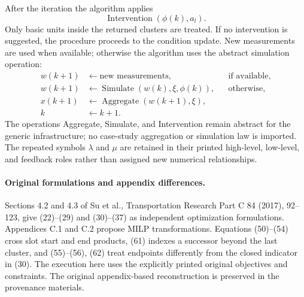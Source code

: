 \documentclass{article}
\begin{document}
After the iteration the algorithm applies
\[
\operatorname{Intervention}(\phi(k),a_l).
\]
Only basic units inside the returned clusters are treated. If no intervention is suggested, the procedure proceeds to the condition update. New measurements are used when available; otherwise the algorithm uses the abstract simulation operation:
\[
\begin{aligned}
w(k+1)&\leftarrow\text{new measurements},&&\text{if available},\\
w(k+1)&\leftarrow\operatorname{Simulate}(w(k),\xi,\phi(k)),&&\text{otherwise},\\
x(k+1)&\leftarrow\operatorname{Aggregate}(w(k+1),\xi),\\
k&\leftarrow k+1.
\end{aligned}
\]
The operations Aggregate, Simulate, and Intervention remain abstract for the generic infrastructure; no case-study aggregation or simulation law is imported. The repeated symbols $\lambda$ and $\mu$ are retained in their printed high-level, low-level, and feedback roles rather than assigned new numerical relationships.


\paragraph{Original formulations and appendix differences.}
Sections 4.2 and 4.3 of Su et al., Transportation Research Part C 84 (2017), 92--123,
give (22)--(29) and (30)--(37) as independent optimization formulations.
Appendices C.1 and C.2 propose MILP transformations. Equations (50)--(54) cross
slot start and end products, (61) indexes a successor beyond the last cluster,
and (55)--(56), (62) treat endpoints differently from the closed indicator in (30).
The execution here uses the explicitly printed original objectives and constraints.
The original appendix-based reconstruction is preserved in the provenance materials.
\end{document}
